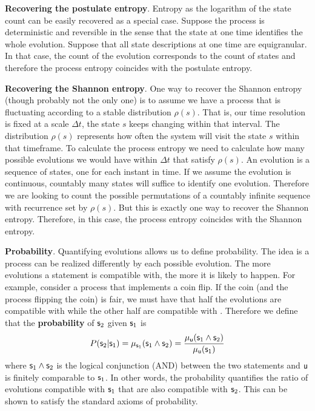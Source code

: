 \documentclass[10pt, onecolumn, longbibliography, nofootinbib]{revtex4-2}
\begin{document}
\textbf{Recovering the postulate entropy}. Entropy as the logarithm of the state count can be easily recovered as a special case. Suppose the process is deterministic and reversible in the sense that the state at one time identifies the whole evolution. Suppose that all state descriptions at one time are equigranular. In that case, the count of the evolution corresponds to the count of states and therefore the process entropy coincides with the postulate entropy.

\textbf{Recovering the Shannon entropy}. One way to recover the Shannon entropy (though probably not the only one) is to assume we have a process that is fluctuating according to a stable distribution $\rho(s)$. That is, our time resolution is fixed at a scale $\Delta t$, the state $s$ keeps changing within that interval. The distribution $\rho(s)$ represents how often the system will visit the state $s$ within that timeframe. To calculate the process entropy we need to calculate how many possible evolutions we would have within $\Delta t$ that satisfy $\rho(s)$. An evolution is a sequence of states, one for each instant in time. If we assume the evolution is continuous, countably many states will suffice to identify one evolution. Therefore we are looking to count the possible permutations of a countably infinite sequence with recurrence set by $\rho(s)$. But this is exactly one way to recover the Shannon entropy. Therefore, in this case, the process entropy coincides with the Shannon entropy.

\textbf{Probability}. Quantifying evolutions allows us to define probability. The idea is a process can be realized differently by each possible evolution. The more evolutions a statement is compatible with, the more it is likely to happen. For example, consider a process that implements a coin flip. If the coin (and the process flipping the coin) is fair, we must have that half the evolutions are compatible with  while the other half are compatible with .  Therefore we define that the \textbf{probability} of $\stmt_2$ given $\stmt_1$ is
\begin{equation}
	P(\stmt_2 | \stmt_1) = \mu_{\stmt_1}(\stmt_1 \AND \stmt_2) = \frac{\mu_{\stmt[u]}(\stmt_1 \AND \stmt_2)}{\mu_{\stmt[u]}(\stmt_1)}
\end{equation} where $\stmt_1 \AND \stmt_2$ is the logical conjunction (AND) between the two statements and $\stmt[u]$ is finitely comparable to $\stmt_1$. In other words, the probability quantifies the ratio of evolutions compatible with $\stmt_1$ that are also compatible with $\stmt_2$. This can be shown to satisfy the standard axioms of probability.
\end{document}
